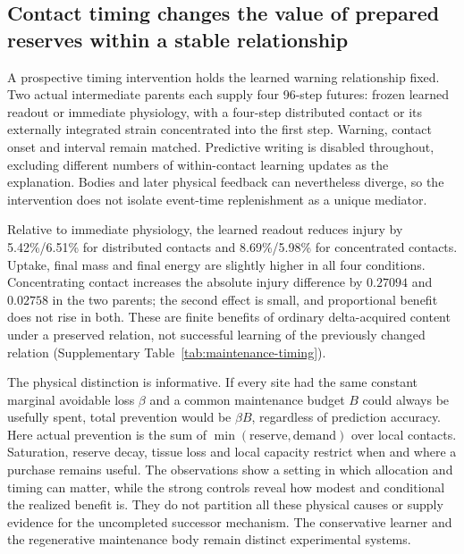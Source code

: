 \subsection*{Contact timing changes the value of prepared reserves within a stable relationship}

A prospective timing intervention holds the learned warning relationship fixed. Two actual intermediate parents each supply four 96-step futures: frozen learned readout or immediate physiology, with a four-step distributed contact or its externally integrated strain concentrated into the first step. Warning, contact onset and interval remain matched. Predictive writing is disabled throughout, excluding different numbers of within-contact learning updates as the explanation. Bodies and later physical feedback can nevertheless diverge, so the intervention does not isolate event-time replenishment as a unique mediator.

Relative to immediate physiology, the learned readout reduces injury by 5.42\%/6.51\% for distributed contacts and 8.69\%/5.98\% for concentrated contacts. Uptake, final mass and final energy are slightly higher in all four conditions. Concentrating contact increases the absolute injury difference by $0.27094$ and $0.02758$ in the two parents; the second effect is small, and proportional benefit does not rise in both. These are finite benefits of ordinary delta-acquired content under a preserved relation, not successful learning of the previously changed relation (Supplementary Table~\ref{tab:maintenance-timing}).

The physical distinction is informative. If every site had the same constant marginal avoidable loss $\beta$ and a common maintenance budget $B$ could always be usefully spent, total prevention would be $\beta B$, regardless of prediction accuracy. Here actual prevention is the sum of $\min(\text{reserve},\text{demand})$ over local contacts. Saturation, reserve decay, tissue loss and local capacity restrict when and where a purchase remains useful. The observations show a setting in which allocation and timing can matter, while the strong controls reveal how modest and conditional the realized benefit is. They do not partition all these physical causes or supply evidence for the uncompleted successor mechanism. The conservative learner and the regenerative maintenance body remain distinct experimental systems.


